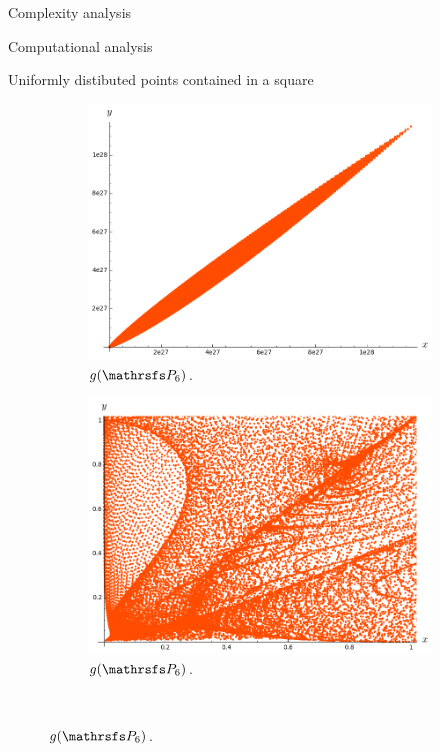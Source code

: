 \documentclass[11pt, a4paper, english, twoside, notitlepage, openright]{report}
\begin{document}
\begin{chapter}{Complexity analysis}
\begin{section}{Computational analysis}
\begin{subsection}{Uniformly distibuted points contained in a square}
\begin{figure}
\hspace{-0.1cm}
\begin{subfigure}{.49\linewidth}\centering
\includegraphics[width=1\textwidth]{plots/ch5_16_P6.png}
\vspace{0cm}\caption{$g(\PP_6)$.\label{fig:gP6_1}}
\end{subfigure}
\begin{subfigure}{.49\linewidth}\centering
\includegraphics[width=1\textwidth]{plots/ch5_17_P6prime.png}
\vspace{0cm}\caption{$g(\PP_6)$.\label{fig:gP6_2}}
\end{subfigure}\\[1ex]
\vspace{0.4cm}
	

\end{figure}
\end{subsection}
\end{section}
\end{chapter}
\end{document}
